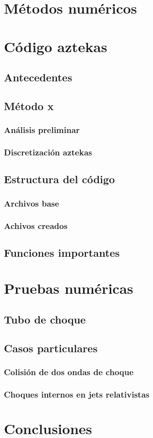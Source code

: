 \documentclass[letterpaper,12pt,oneside]{book}
\begin{document}
\chapter{Métodos numéricos}

\chapter{Código aztekas}
    \section{Antecedentes}
    \section{Método x}
        \subsection{Análisis preliminar}
        \subsection{Discretización aztekas}
        \section{Estructura del código}
        \subsection{Archivos base}
        \subsection{Achivos creados}
    \section{Funciones importantes}
    
\chapter{Pruebas numéricas}
    \section{Tubo de choque}
    \section{Casos particulares}
        \subsection{Colisión de dos ondas de choque}
        \subsection{Choques internos en jets relativistas}
    
\chapter{Conclusiones}  

%
%

\backmatter%
\end{document}
